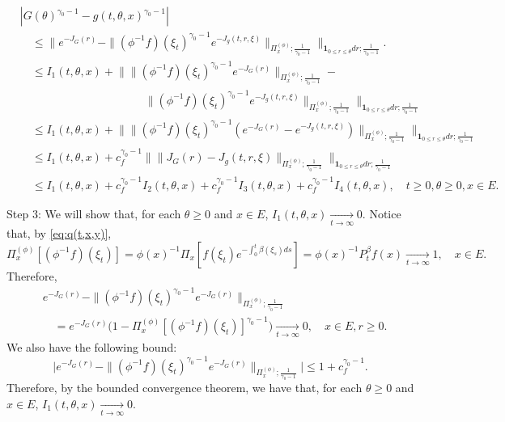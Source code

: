 \documentclass[12pt, a4paper]{amsart}
\theoremstyle{definition}
\numberwithin{equation}{section}
\begin{document}
\begin{equation}\begin{split}
	&|  G(\theta)^{\gamma_0 - 1} - g(t,\theta,x)^{\gamma_0 - 1} |
	\\&\quad \leq \Big\| e^{ - J_G(r)} - \| (\phi^{-1}f)(\xi_t)^{\gamma_0 - 1} e^{-J_g(t, r,\xi)} \|_{\Pi_x^{(\phi)};\frac{1}{\gamma_0 - 1}} \Big\|_{\mathbf 1_{0\leq r\leq \theta} dr;\frac{1}{\gamma_0 - 1}}.
	\\&\quad \leq I_1(t,\theta,x) + \Big\| \| (\phi^{-1}f)(\xi_t)^{\gamma_0 - 1} e^{-J_G(r)} \|_{\Pi_x^{(\phi)};\frac{1}{\gamma_0 - 1}} -
	\\&\quad \qquad \qquad \qquad \qquad \qquad \| (\phi^{-1}f)(\xi_t)^{\gamma_0 - 1} e^{-J_g(t,r,\xi)} \|_{\Pi_x^{(\phi)};\frac{1}{\gamma_0 - 1}} \Big\|_{\mathbf 1_{0\leq r\leq \theta} dr;\frac{1}{\gamma_0 - 1}}
	\\&\quad \leq I_1(t,\theta,x) + \Big\| \|  (\phi^{-1}f)(\xi_t)^{\gamma_0 - 1} ( e^{-J_G(r)} - e^{-J_g(t,r,\xi)} )  \|_{\Pi_x^{(\phi)};\frac{1}{\gamma_0 - 1}} \Big\|_{\mathbf 1_{0\leq r\leq \theta} dr;\frac{1}{\gamma_0 - 1}}
	\\&\quad \leq I_1(t,\theta,x) + c_f^{\gamma_0 - 1}\Big\| \|  J_G(r) -J_g(t,r,\xi)  \|_{\Pi_x^{(\phi)};\frac{1}{\gamma_0 - 1}} \Big\|_{\mathbf 1_{0\leq r\leq \theta} dr;\frac{1}{\gamma_0 - 1}}
	\\&\quad \leq I_1(t,\theta,x) + c_f^{\gamma_0 - 1} I_2(t,\theta,x) +c_f^{\gamma_0 - 1} I_3(t,\theta,x)+c_f^{\gamma_0 - 1} I_4(t,\theta,x),
	\quad t\geq 0, \theta \geq 0, x\in E.
\end{split}
\end{equation}
	
	Step 3: We will show that, for each $\theta \geq 0$ and $x\in E$, $I_1(t,\theta,x) \xrightarrow[t\to \infty]{} 0$.
	Notice that,
	by \eqref{eq:q(t,x,y)},
\begin{equation}
	\Pi_x^{(\phi)} [(\phi^{-1}f)(\xi_t)]
	= \phi(x)^{-1}\Pi_x[f(\xi_t) e^{- \int_0^t \beta(\xi_s) ds}]
	= \phi(x)^{-1} P^\beta_t f(x)
	\xrightarrow[t\to \infty]{} 1,
	\quad x\in E.
\end{equation}
	Therefore,
\begin{equation}\begin{split}
	&e^{ - J_G(r)} - \| (\phi^{-1}f)(\xi_t)^{\gamma_0 - 1} e^{-J_G(r)} \|_{\Pi_x^{(\phi)};\frac{1}{\gamma_0 - 1}}
	\\&\quad =e^{ - J_G(r)} \Big( 1   -  \Pi_x^{(\phi)}[ (\phi^{-1}f)(\xi_t) ]^{\gamma_0 - 1}   \Big)
	\xrightarrow[t\to \infty]{} 0,
	\quad x\in E, r\geq 0.
\end{split}\end{equation}
	We also have the following bound:
\begin{equation}
	\Big| e^{ - J_G(r)} - \| (\phi^{-1}f)(\xi_t)^{\gamma_0 - 1} e^{-J_G(r)} \|_{\Pi_x^{(\phi)};\frac{1}{\gamma_0 - 1}} \Big|
	\leq 1+ c_f^{\gamma_0 - 1}.
\end{equation}
	Therefore, by the bounded convergence theorem, we have that, for each $\theta \geq 0$ and $x\in E$, $I_1(t,\theta, x) \xrightarrow[t\to \infty]{} 0$.
	
\end{document}
